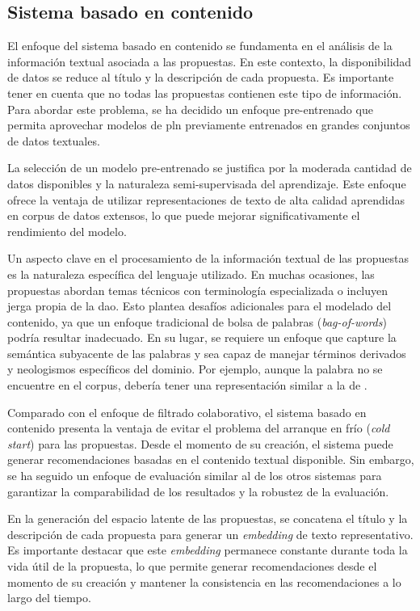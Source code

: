 \subsection{Sistema basado en contenido}
\label{subsec:implementacion-contenido}

El enfoque del sistema basado en contenido se fundamenta en el análisis de la información textual asociada a las propuestas. En este contexto, la disponibilidad de datos se reduce al título y la descripción de cada propuesta. Es importante tener en cuenta que no todas las propuestas contienen este tipo de información. Para abordar este problema, se ha decidido un enfoque pre-entrenado que permita aprovechar modelos de \gls{pln} previamente entrenados en grandes conjuntos de datos textuales.

La selección de un modelo pre-entrenado se justifica por la moderada cantidad de datos disponibles y la naturaleza semi-supervisada del aprendizaje. Este enfoque ofrece la ventaja de utilizar representaciones de texto de alta calidad aprendidas en corpus de datos extensos, lo que puede mejorar significativamente el rendimiento del modelo.

Un aspecto clave en el procesamiento de la información textual de las propuestas es la naturaleza específica del lenguaje utilizado. En muchas ocasiones, las propuestas abordan temas técnicos con terminología especializada o incluyen jerga propia de la \gls{dao}. Esto plantea desafíos adicionales para el modelado del contenido, ya que un enfoque tradicional de bolsa de palabras (\textit{bag-of-words}) podría resultar inadecuado. En su lugar, se requiere un enfoque que capture la semántica subyacente de las palabras y sea capaz de manejar términos derivados y neologismos específicos del dominio. Por ejemplo, aunque la palabra  no se encuentre en el corpus, debería tener una representación similar a la de .

Comparado con el enfoque de filtrado colaborativo, el sistema basado en contenido presenta la ventaja de evitar el problema del arranque en frío (\textit{cold start}) para las propuestas. Desde el momento de su creación, el sistema puede generar recomendaciones basadas en el contenido textual disponible. Sin embargo, se ha seguido un enfoque de evaluación similar al de los otros sistemas para garantizar la comparabilidad de los resultados y la robustez de la evaluación.

En la generación del espacio latente de las propuestas, se concatena el título y la descripción de cada propuesta para generar un \textit{embedding} de texto representativo. Es importante destacar que este \textit{embedding} permanece constante durante toda la vida útil de la propuesta, lo que permite generar recomendaciones desde el momento de su creación y mantener la consistencia en las recomendaciones a lo largo del tiempo.

